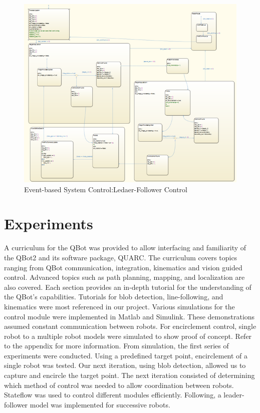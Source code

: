 \begin{figure}[htbp] 
\begin{center}
\includegraphics[width=5in]{10}
\caption{Event-based System Control:Ledaer-Follower Control} \label{fig:10}
\end{center}
\end{figure}


\section{Experiments}
A curriculum for the QBot was provided to allow interfacing and familiarity of the QBot2 and its software package, QUARC. The curriculum covers topics ranging from QBot communication, integration, kinematics and vision guided control. Advanced topics such as path planning, mapping, and localization are also covered. Each section provides an in-depth tutorial for the understanding of the QBot’s capabilities. Tutorials for blob detection, line-following, and kinematics were most referenced in our project.
Various simulations for the control module were implemented in Matlab and Simulink. These demonstrations assumed constant communication between robots. For encirclement control, single robot to a multiple robot models were simulated to show proof of concept. Refer to the appendix for more information.
From simulation, the first series of experiments were conducted. Using a predefined target point, encirclement of a single robot was tested. Our next iteration, using blob detection, allowed us to capture and encircle the target point. The next iteration consisted of determining which method of control was needed to allow coordination between robots. Stateflow was used to control different modules efficiently. Following, a leader-follower model was implemented for successive robots.

